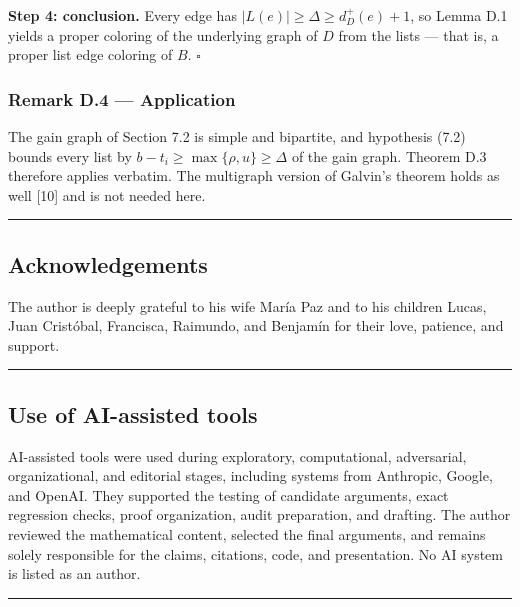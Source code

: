 \documentclass[
  11pt,
]{article}
\begin{document}
\textbf{Step 4: conclusion.} Every edge has \(|L(e)|\ge\Delta\ge d^+_D(e)+1\), so Lemma D.1 yields a proper coloring of the underlying graph of \(D\) from the lists --- that is, a proper list edge coloring of \(B\). \(\square\)

\subsubsection{Remark D.4 --- Application}\label{remark-d.4-application}

The gain graph of Section 7.2 is simple and bipartite, and hypothesis (7.2) bounds every list by \(b-t_i\ge\max\{\rho,u\}\ge\Delta\) of the gain graph. Theorem D.3 therefore applies verbatim. The multigraph version of Galvin's theorem holds as well {[}10{]} and is not needed here.

\begin{center}\rule{0.5\linewidth}{0.5pt}\end{center}

\subsection{Acknowledgements}\label{acknowledgements}

The author is deeply grateful to his wife María Paz and to his children Lucas, Juan Cristóbal, Francisca, Raimundo, and Benjamín for their love, patience, and support.

\begin{center}\rule{0.5\linewidth}{0.5pt}\end{center}

\subsection{Use of AI-assisted tools}\label{use-of-ai-assisted-tools}

AI-assisted tools were used during exploratory, computational, adversarial, organizational, and editorial stages, including systems from Anthropic, Google, and OpenAI. They supported the testing of candidate arguments, exact regression checks, proof organization, audit preparation, and drafting. The author reviewed the mathematical content, selected the final arguments, and remains solely responsible for the claims, citations, code, and presentation. No AI system is listed as an author.

\begin{center}\rule{0.5\linewidth}{0.5pt}\end{center}
\end{document}
